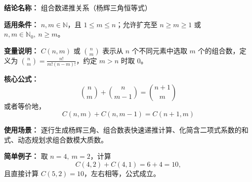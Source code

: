 \textbf{结论名称：} 组合数递推关系（杨辉三角恒等式）

\textbf{适用条件：} \(n,m\in\mathbb{N}\)，且 \(1 \leq m \leq n\)；允许扩充至 \(n\geq m \geq 1\) 或 \(n,m\in\mathbb{N}_0,\ n \ge m\)。

\textbf{变量说明：} \(C(n,m)\) 或 \(\binom{n}{m}\) 表示从 \(n\) 个不同元素中选取 \(m\) 个的组合数，定义为 \(\displaystyle\binom{n}{m}=\frac{n!}{m!(n-m)!}\)，约定 \(m>n\) 时取 \(0\)。

\textbf{核心公式：}
\[
\boxed{\binom{n}{m}+\binom{n}{m-1}=\binom{n+1}{m}}
\]
或者等价地，
\[
\boxed{C(n,m)+C(n,m-1)=C(n+1,m)}
\]

\textbf{使用场景：} 逐行生成杨辉三角、组合数表快速递推计算、化简含二项式系数的和式、动态规划求组合数模大质数。

\textbf{简单例子：} 取 \(n=4,\ m=2\)，计算
\[
C(4,2)+C(4,1)=6+4=10,
\]
且直接计算 \(C(5,2)=10\)，左右相等，公式成立。